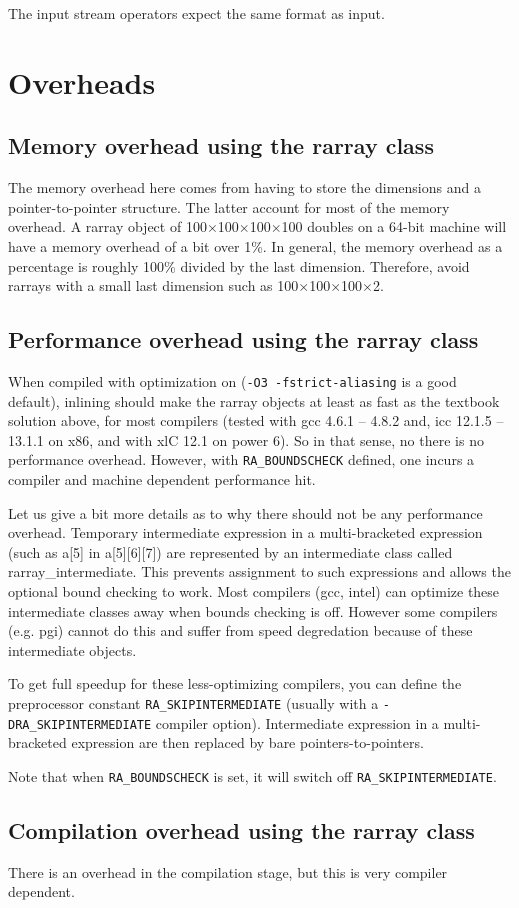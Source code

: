 \documentclass[11pt,twoside]{article}
\begin{document}
The input stream operators expect the same format as input.

\section{Overheads}

\subsection{Memory overhead using the rarray class}

The memory overhead here comes from having to store the dimensions and a pointer-to-pointer structure.  The latter account for most of the memory overhead.   A rarray object of 100$\times$100$\times$100$\times$100  doubles on a 64-bit machine will have a memory overhead of a bit over 1\%. In general, the memory overhead as a percentage is roughly 100\% divided by the last dimension. Therefore, avoid rarrays with a small last dimension such as 100$\times$100$\times$100$\times$2.

\subsection{Performance overhead using the rarray class}

When compiled with optimization on (\texttt{-O3 -fstrict-aliasing} is a good default), inlining should make the rarray objects at least as fast as the textbook solution above, for most compilers (tested with gcc 4.6.1 -- 4.8.2 and, icc 12.1.5 -- 13.1.1 on x86, and with xlC 12.1 on power 6).
So in that sense, no there is no performance overhead.  However, with \texttt{{\tt RA\_BOUNDSCHECK}} defined, one incurs a compiler and machine dependent performance hit.

Let us give a bit more details as to why there should not be any performance overhead. Temporary intermediate expression in a multi-bracketed expression (such as a[5] in a[5][6][7]) are represented by an intermediate class called rarray\_intermediate. This prevents assignment to such expressions and allows the optional bound checking to work.  Most compilers (gcc, intel) can optimize these intermediate classes away when bounds checking is off. However
some compilers (e.g. pgi) cannot do this and suffer from speed degredation because of these intermediate objects.

To get full speedup for these less-optimizing compilers, you can define the preprocessor constant \texttt{RA\_SKIPINTERMEDIATE} (usually with a \texttt{-DRA\_SKIPINTERMEDIATE} compiler option).  Intermediate expression in a multi-bracketed expression are then replaced by bare pointers-to-pointers.

Note that when \texttt{RA\_BOUNDSCHECK} is set, it will switch off \texttt{RA\_SKIPINTERMEDIATE}.

\subsection{Compilation overhead using the rarray class}

There is an overhead in the compilation stage, but this is very compiler dependent.
\end{document}
